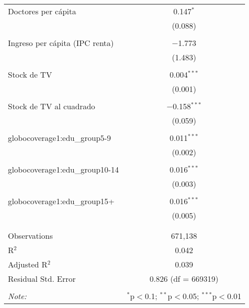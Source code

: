 \begin{table}[!htbp]
\begin{tabular}{@{\extracolsep{5pt}}lc}
 Doctores per cápita & 0.147$^{*}$ \\ 
  & (0.088) \\ 
  & \\ 
 Ingreso per cápita (IPC renta) & $-$1.773 \\ 
  & (1.483) \\ 
  & \\ 
 Stock de TV & 0.004$^{***}$ \\ 
  & (0.001) \\ 
  & \\ 
 Stock de TV al cuadrado & $-$0.158$^{***}$ \\ 
  & (0.059) \\ 
  & \\ 
 globocoverage1:edu\_group5-9 & 0.011$^{***}$ \\ 
  & (0.002) \\ 
  & \\ 
 globocoverage1:edu\_group10-14 & 0.016$^{***}$ \\ 
  & (0.003) \\ 
  & \\ 
 globocoverage1:edu\_group15+ & 0.016$^{***}$ \\ 
  & (0.005) \\ 
  & \\ 
\hline \\[-1.8ex] 
Observations & 671,138 \\ 
R$^{2}$ & 0.042 \\ 
Adjusted R$^{2}$ & 0.039 \\ 
Residual Std. Error & 0.826 (df = 669319) \\ 
\hline 
\hline \\[-1.8ex] 
\textit{Note:}  & \multicolumn{1}{r}{$^{*}$p$<$0.1; $^{**}$p$<$0.05; $^{***}$p$<$0.01} \\ 
\end{tabular} 
\end{table} 

